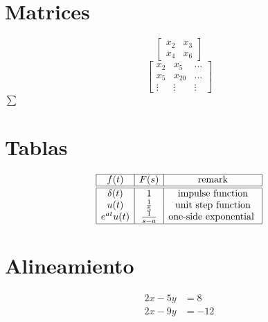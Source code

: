 \documentclass{article}
\begin{document}
	\section*{Matrices}
	\[
	\begin{bmatrix}
		x_{2} & x_{3}\\
		x_{4} & x_{6}
	\end{bmatrix}
	\]
	\[
	\begin{bmatrix}
	x_{2} & x_{5} & \dots\\
	x_{5} & x_{20} & \dots\\
	\vdots & \vdots & \vdots
	\end{bmatrix}
	\]
	$\sum$
	\section*{Tablas}
	\[
	\begin{array}{|c|c|c|}
	\hline
	f(t) & F(s) & \mbox{remark}\\
	\hline\hline
	\delta(t) & 1 & \mbox{impulse function}\\
	u(t) & \frac{1}{5} & \mbox{unit step function}\\
	e^{at}u(t) & \frac{1}{s-a} & \mbox{one-side exponential }\\
	\hline
	\end{array}
	\]
	\section*{Alineamiento}
	\begin{align*}
	2x - 5y &= 8\\
	2x - 9y &= -12\\
	\end{align*}
	
\end{document}

